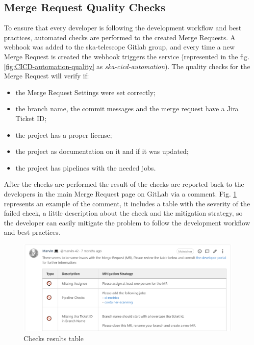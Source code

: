 \documentclass[a4paper,
               keeplastbox,   %
               ]{jacow}
\begin{document}
 \subsection{Merge Request Quality Checks}
 
 To ensure that every developer is following the development workflow and best practices, automated checks are performed to the created Merge Requests. A webhook was added to the ska-telescope Gitlab group, and every time a new Merge Request is created the webhook triggers the service (represented in the fig. \ref{fig:CICD-automation-quality} as \textit{ska-cicd-automation}\cite{ska-cicd-automation}). The quality checks for the Merge Request will verify if:
 
 \begin{itemize}
     \item the Merge Request Settings were set correctly;
     \item the branch name, the commit messages and the merge request have a Jira Ticket ID;
     \item the project has a proper license;
     \item the project as documentation on it and if it was updated;
     \item the project has pipelines with the needed jobs.
 \end{itemize}
 
 After the checks are performed the result of the checks are reported back to the developers in the main Merge Request page on GitLab via a comment. Fig. \ref{fig:marvin-table} represents an example of the comment, it includes a table with the severity of the failed check, a little description about the check and the mitigation strategy, so the developer can easily mitigate the problem to follow the development workflow and best practices. 
 
 \begin{figure}[!htb]
    \centering
    \includegraphics*[width=0.8\columnwidth]{marvin-table}
    \caption{Checks results table}
    \label{fig:marvin-table}
 \end{figure}
 
\end{document}
